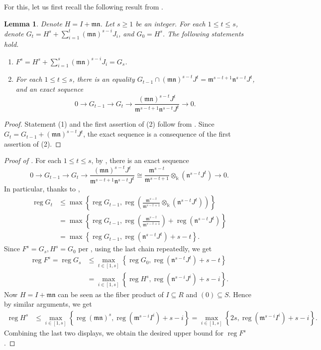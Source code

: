 \documentclass{amsart}
\DeclareMathOperator{\reg}{reg}
\newcommand{\mm}{\mathfrak{m}}
\newcommand{\nn}{\mathfrak{n}}
\theoremstyle{plain}
\newtheorem{lem}[thm]{Lemma}
\theoremstyle{definition}
\numberwithin{equation}{section}
\newcommand{\kk}{\Bbbk}
\begin{document}
For this, let us first recall the following result from \cite{NgV19b}.
\begin{lem}
\label{lem_exactseq}
 Denote $H=I+\mm\nn$. Let $s\ge 1$ be an integer. For each $1\le t\le s$, denote $G_t=H^s+\sum\limits_{i=1}^t (\mm\nn)^{s-i}J_i$, and $G_0=H^s$. The following statements hold.
 \begin{enumerate}[\quad \rm (1)]
  \item $F^s=H^s+\sum\limits_{i=1}^s(\mm\nn)^{s-i}J_i=G_s$.
  \item For each $1\le t\le s$, there is an equality $G_{t-1} \cap (\mm\nn)^{s-t}J^t=\mm^{s-t+1}\nn^{s-t}J^t$,  and an exact sequence
  \[
0\to G_{t-1} \to G_t \to \frac{(\mm\nn)^{s-t}J^t}{\mm^{s-t+1}\nn^{s-t}J^t} \to 0.
  \]
 \end{enumerate}
\end{lem}
\begin{proof}
Statement (1) and the first assertion of (2) follow from \cite[Proposition 4.4]{NgV19b}. Since  $G_t=G_{t-1}+(\mm\nn)^{s-t}J^t$, the exact sequence is a consequence of the first assertion of (2).
\end{proof}

\begin{proof}[Proof of ]
For each $1\le t\le s$, by , there is an exact sequence
  \[
0\to G_{t-1} \to G_t \to \frac{(\mm\nn)^{s-t}J^t}{\mm^{s-t+1}\nn^{s-t}J^t} \cong \frac{\mm^{s-t}}{\mm^{s-t+1}}\otimes_\kk (\nn^{s-t}J^t) \to 0.
  \]
In particular, thanks to , 
\begin{align*}
\reg G_t &\le \max \left\{\reg G_{t-1}, \reg \left( \frac{\mm^{s-t}}{\mm^{s-t+1}}\otimes_\kk (\nn^{s-t}J^t)\right) \right\}\\
         &= \max \left\{\reg G_{t-1}, \reg \left( \frac{\mm^{s-t}}{\mm^{s-t+1}}\right )+\reg (\nn^{s-t}J^t) \right\}\\
         &=\max \left\{\reg G_{t-1}, \reg (\nn^{s-t}J^t)+s-t \right\}.
\end{align*}
Since $F^s=G_s, H^s=G_0$ per , using the last chain repeatedly, we get
\begin{align*}
\reg F^s =\reg G_s &\le \max_{t\in [1,s]}\left\{\reg G_0, \reg (\nn^{s-t}J^t)+s-t \right\}\\ 
                   &= \max_{i\in [1,s]}\left\{\reg H^s, \reg (\nn^{s-i}J^i)+s-i \right\}.
\end{align*}
Now $H=I+\mm\nn$ can be seen as the fiber product of $I\subseteq R$ and $(0)\subseteq S$. Hence by similar arguments, we get
\begin{align*}
\reg H^s & \le \max_{i\in [1,s]}\left\{\reg (\mm\nn)^s, \reg (\mm^{s-i}I^i)+s-i \right\} =\max_{i\in [1,s]}\left\{2s, \reg (\mm^{s-i}I^i)+s-i \right\}.
\end{align*}
Combining the last two displays, we obtain the desired upper bound for $\reg F^s$.
\end{proof}
\end{document}
